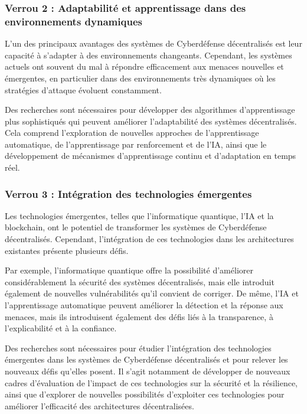 \subsubsection{Verrou 2 : Adaptabilité et apprentissage dans des environnements dynamiques}

L’un des principaux avantages des systèmes de Cyberdéfense décentralisés est leur capacité à s’adapter à des environnements changeants. Cependant, les systèmes actuels ont souvent du mal à répondre efficacement aux menaces nouvelles et émergentes, en particulier dans des environnements très dynamiques où les stratégies d’attaque évoluent constamment.

Des recherches sont nécessaires pour développer des algorithmes d’apprentissage plus sophistiqués qui peuvent améliorer l’adaptabilité des systèmes décentralisés. Cela comprend l’exploration de nouvelles approches de l’apprentissage automatique, de l’apprentissage par renforcement et de l’IA, ainsi que le développement de mécanismes d’apprentissage continu et d’adaptation en temps réel.


\subsubsection{Verrou 3 : Intégration des technologies émergentes}

Les technologies émergentes, telles que l’informatique quantique, l’IA et la blockchain, ont le potentiel de transformer les systèmes de Cyberdéfense décentralisés. Cependant, l’intégration de ces technologies dans les architectures existantes présente plusieurs défis.

Par exemple, l’informatique quantique offre la possibilité d’améliorer considérablement la sécurité des systèmes décentralisés, mais elle introduit également de nouvelles vulnérabilités qu’il convient de corriger. De même, l’IA et l’apprentissage automatique peuvent améliorer la détection et la réponse aux menaces, mais ils introduisent également des défis liés à la transparence, à l’explicabilité et à la confiance.

Des recherches sont nécessaires pour étudier l’intégration des technologies émergentes dans les systèmes de Cyberdéfense décentralisés et pour relever les nouveaux défis qu’elles posent. Il s’agit notamment de développer de nouveaux cadres d’évaluation de l’impact de ces technologies sur la sécurité et la résilience, ainsi que d’explorer de nouvelles possibilités d’exploiter ces technologies pour améliorer l’efficacité des architectures décentralisées.


